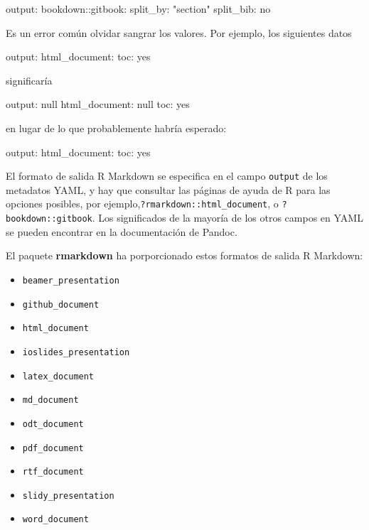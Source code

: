 \documentclass[12pt,]{krantz}
\makeatletter
\newenvironment{Shaded}{\begin{snugshade}}{\end{snugshade}}
\newcommand{\DataTypeTok}[1]{\textcolor[rgb]{0.13,0.29,0.53}{#1}}
\newcommand{\StringTok}[1]{\textcolor[rgb]{0.31,0.60,0.02}{#1}}
\newcommand{\FunctionTok}[1]{\textcolor[rgb]{0.00,0.00,0.00}{#1}}
\newcommand{\AttributeTok}[1]{\textcolor[rgb]{0.77,0.63,0.00}{#1}}
\providecommand{\tightlist}{%
  \setlength{\itemsep}{0pt}\setlength{\parskip}{0pt}}
\newenvironment{kframe}{%
\medskip{}
\setlength{\fboxsep}{.8em}
 \def\at@end@of@kframe{}%
 \ifinner\ifhmode%
  \def\at@end@of@kframe{\end{minipage}}%
  \begin{minipage}{\columnwidth}%
 \fi\fi%
 \def\FrameCommand##1{\hskip\@totalleftmargin \hskip-\fboxsep
 \colorbox{shadecolor}{##1}\hskip-\fboxsep
     \hskip-\linewidth \hskip-\@totalleftmargin \hskip\columnwidth}%
 \MakeFramed {\advance\hsize-\width
   \@totalleftmargin\z@ \linewidth\hsize
   \@setminipage}}%
 {\par\unskip\endMakeFramed%
 \at@end@of@kframe}
\renewenvironment{Shaded}{\begin{kframe}}{\end{kframe}}
\theoremstyle{definition}
\theoremstyle{definition}
\theoremstyle{definition}
\theoremstyle{remark}
\makeatother
\begin{document}
\begin{Shaded}
\begin{Highlighting}[]
\FunctionTok{output:}
  \FunctionTok{bookdown:}\AttributeTok{:gitbook:}
    \FunctionTok{split_by:}\AttributeTok{ }\StringTok{"section"}
    \FunctionTok{split_bib:}\AttributeTok{ no}
\end{Highlighting}
\end{Shaded}

Es un error común olvidar sangrar los valores. Por ejemplo, los
siguientes datos

\begin{Shaded}
\begin{Highlighting}[]
\FunctionTok{output:}
\FunctionTok{html_document:}
\FunctionTok{toc:}\AttributeTok{ yes}
\end{Highlighting}
\end{Shaded}

significaría

\begin{Shaded}
\begin{Highlighting}[]
\FunctionTok{output:}\AttributeTok{ }\DataTypeTok{null}
\FunctionTok{html_document:}\AttributeTok{ }\DataTypeTok{null}
\FunctionTok{toc:}\AttributeTok{ yes}
\end{Highlighting}
\end{Shaded}

en lugar de lo que probablemente habría esperado:

\begin{Shaded}
\begin{Highlighting}[]
\FunctionTok{output:}
  \FunctionTok{html_document:}
    \FunctionTok{toc:}\AttributeTok{ yes}
\end{Highlighting}
\end{Shaded}

El formato de salida R Markdown se especifica en el campo
\texttt{output} de los metadatos YAML, y hay que consultar las páginas
de ayuda de R para las opciones posibles, por
ejemplo,\texttt{?rmarkdown::html\_document}, o
\texttt{?bookdown::gitbook}. Los significados de la mayoría de los otros
campos en YAML se pueden encontrar en la documentación de Pandoc.

El paquete \textbf{rmarkdown} ha porporcionado estos formatos de salida
R Markdown:

\begin{itemize}
\tightlist
\item
  \texttt{beamer\_presentation}
\item
  \texttt{github\_document}
\item
  \texttt{html\_document}
\item
  \texttt{ioslides\_presentation}
\item
  \texttt{latex\_document}
\item
  \texttt{md\_document}
\item
  \texttt{odt\_document}
\item
  \texttt{pdf\_document}
\item
  \texttt{rtf\_document}
\item
  \texttt{slidy\_presentation}
\item
  \texttt{word\_document}
\end{itemize}
\end{document}
